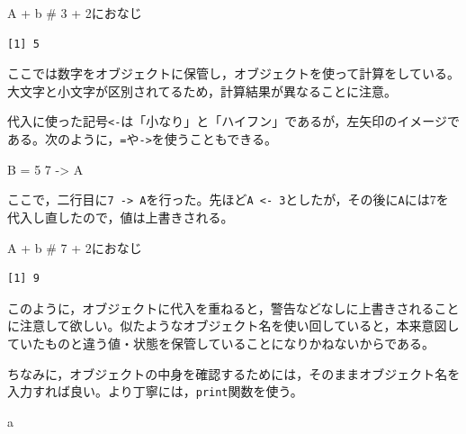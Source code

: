 \documentclass[
  a4paper,
]{ltjsbook}
\newenvironment{Shaded}{\begin{snugshade}}{\end{snugshade}}
\newcommand{\CommentTok}[1]{\textcolor[rgb]{0.37,0.37,0.37}{#1}}
\newcommand{\DecValTok}[1]{\textcolor[rgb]{0.68,0.00,0.00}{#1}}
\newcommand{\NormalTok}[1]{\textcolor[rgb]{0.00,0.23,0.31}{#1}}
\newcommand{\OtherTok}[1]{\textcolor[rgb]{0.00,0.23,0.31}{#1}}
\newcommand{\SpecialCharTok}[1]{\textcolor[rgb]{0.37,0.37,0.37}{#1}}
\begin{document}
\begin{Shaded}
\begin{Highlighting}[]
\NormalTok{A }\SpecialCharTok{+}\NormalTok{ b }\CommentTok{\# 3 + 2におなじ}
\end{Highlighting}
\end{Shaded}

\begin{verbatim}
[1] 5
\end{verbatim}

ここでは数字をオブジェクトに保管し，オブジェクトを使って計算をしている。大文字と小文字が区別されてるため，計算結果が異なることに注意。

代入に使った記号\texttt{\textless{}-}は「小なり」と「ハイフン」であるが，左矢印のイメージである。次のように，\texttt{=}や\texttt{-\textgreater{}}を使うこともできる。

\begin{Shaded}
\begin{Highlighting}[]
\NormalTok{B }\OtherTok{=} \DecValTok{5}
\DecValTok{7} \OtherTok{{-}\textgreater{}}\NormalTok{ A}
\end{Highlighting}
\end{Shaded}

ここで，二行目に\texttt{7\ -\textgreater{}\ A}を行った。先ほど\texttt{A\ \textless{}-\ 3}としたが，その後に\texttt{A}には7を代入し直したので，値は上書きされる。

\begin{Shaded}
\begin{Highlighting}[]
\NormalTok{A }\SpecialCharTok{+}\NormalTok{ b }\CommentTok{\# 7 + 2におなじ}
\end{Highlighting}
\end{Shaded}

\begin{verbatim}
[1] 9
\end{verbatim}

このように，オブジェクトに代入を重ねると，警告などなしに上書きされることに注意して欲しい。似たようなオブジェクト名を使い回していると，本来意図していたものと違う値・状態を保管していることになりかねないからである。

ちなみに，オブジェクトの中身を確認するためには，そのままオブジェクト名を入力すれば良い。より丁寧には，\texttt{print}関数を使う。

\begin{Shaded}
\begin{Highlighting}[]
\NormalTok{a}
\end{Highlighting}
\end{Shaded}
\end{document}
